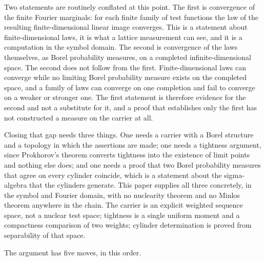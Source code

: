 Two statements are routinely conflated at this point.  The first is convergence
of the finite Fourier marginals: for each finite family of test functions the
law of the resulting finite-dimensional linear image converges.  This is a
statement about finite-dimensional laws, it is what a lattice measurement can
see, and it is a computation in the symbol domain.  The second is convergence of
the laws themselves, as Borel probability measures, on a completed
infinite-dimensional space.  The second does not follow from the first.
Finite-dimensional laws can converge while no limiting Borel probability measure
exists on the completed space, and a family of laws can converge on one
completion and fail to converge on a weaker or stronger one.  The first
statement is therefore evidence for the second and not a substitute for it, and
a proof that establishes only the first has not constructed a measure on the
carrier at all.

Closing that gap needs three things.  One needs a carrier with a Borel structure
and a topology in which the assertions are made; one needs a tightness
argument, since Prokhorov's theorem converts tightness into the existence of
limit points and nothing else does; and one needs a proof that two Borel
probability measures that agree on every cylinder coincide, which is a statement
about the sigma-algebra that the cylinders generate.  This paper supplies all
three concretely, in the symbol and Fourier domain, with no nuclearity theorem
and no Minlos theorem anywhere in the chain.  The carrier is an explicit
weighted sequence space, not a nuclear test space; tightness is a single uniform
moment and a compactness comparison of two weights; cylinder determination is
proved from separability of that space.

The argument has five moves, in this order.

